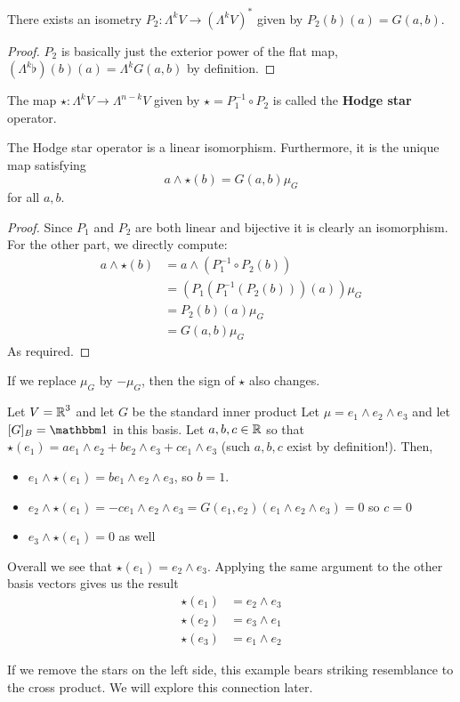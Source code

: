 \begin{lemma}
    There exists an isometry $P_2 : \Lambda^k V\to (\Lambda^k V)^*$ given by $P_2(b)(a) = G(a,b)$.
\end{lemma}
\begin{proof}
    $P_2$ is basically just the exterior power of the flat map, $(\Lambda^k \flat)(b)(a) = \Lambda^k G(a,b)$ by definition.
\end{proof}
\begin{defn} The map $\star : \Lambda^k V \to \Lambda^{n-k} V$ given by $\star = P_1^{-1} \circ P_2$ is called the \textbf{Hodge star} operator.
\end{defn}
\begin{thm}
    The Hodge star operator is a linear isomorphism. Furthermore, it is the unique map satisfying 
    \begin{equation}a \wedge \star(b) = G(a,b)\mu_G\end{equation} for all $a,b$.
\end{thm}
\begin{proof}
    Since $P_1$ and $P_2$ are both linear and bijective it is clearly an isomorphism. For the other part, we directly compute:
    \begin{align*}
        a\wedge \star(b) &= a\wedge (P_1^{-1}\circ P_2(b))\\
        &= (P_1(P_1^{-1}(P_2(b)))(a))\mu_G\\
        &= P_2(b)(a)\mu_G\\
        &= G(a,b)\mu_G
    \end{align*}
    As required.
\end{proof}
\begin{remark*}
    If we replace $\mu_G$ by $-\mu_G$, then the sign of $\star$ also changes.
\end{remark*}
\begin{example}
Let $V = \operatorname{\mathbb{R}}^3$ and let $G$ be the standard inner product
Let $\mu = e_1\wedge e_2\wedge e_3$ and let $[G]_B = \One$ in this basis. Let $a,b,c\in\operatorname{\mathbb{R}}$ so that $\star(e_1) = a e_1 \wedge e_2 + b e_2\wedge e_3 + c e_1\wedge e_3$ (such $a,b,c$ exist by definition!). Then,
\begin{itemize}
    \item $e_1\wedge \star(e_1) = b e_1\wedge e_2 \wedge e_3$, so $b=1$. 
    \item $e_2 \wedge \star(e_1) = -c e_1\wedge e_2\wedge e_3 = G(e_1,e_2) (e_1\wedge e_2 \wedge e_3) = 0$ so $c=0$
    \item $e_3\wedge \star(e_1) = 0$ as well
\end{itemize}
Overall we see that $\star(e_1) = e_2\wedge e_3$. Applying the same argument to the other basis vectors gives us the result
\begin{align}
\star(e_1) &= e_2\wedge e_3\\
\star(e_2)&=e_3\wedge e_1\\
\star(e_3)&=e_1\wedge e_2
\end{align}
\end{example}
\begin{remark*}
    If we remove the stars on the left side, this example bears striking resemblance to the cross product. We will explore this connection later.
\end{remark*}
